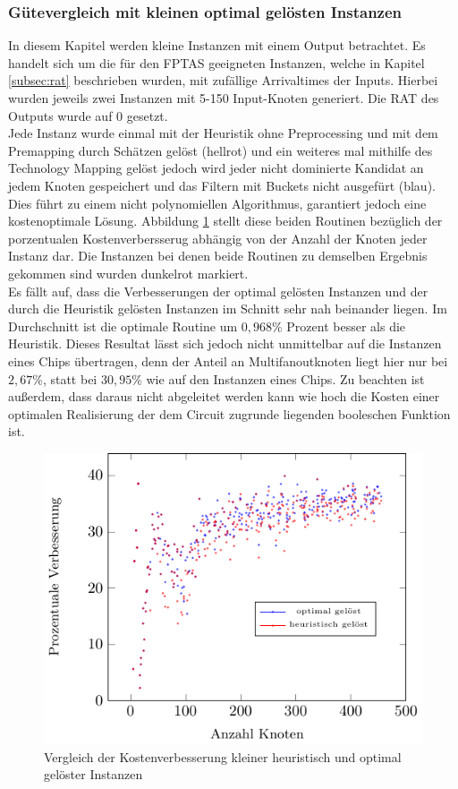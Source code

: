 \documentclass[11pt, a4paper, german]{article}
\newcommand{\TM}{Technology  Mapping }
\begin{document}
\subsubsection{Gütevergleich mit kleinen optimal gel\"osten Instanzen}
\label{subsubsec:guetevgl_kleiner_opt_instanzen}
In diesem Kapitel werden kleine Instanzen mit einem Output betrachtet. Es handelt sich um die f\"ur den FPTAS geeigneten Instanzen, welche in Kapitel \ref{subsec:rat} beschrieben wurden, mit zuf\"allige Arrivaltimes der Inputs. Hierbei wurden jeweils zwei Instanzen mit 5-150 Input-Knoten generiert. Die RAT des Outputs wurde auf $0$ gesetzt.\\
Jede Instanz wurde einmal mit der Heuristik ohne Preprocessing und mit dem Premapping durch Sch\"atzen gel\"ost (hellrot) und ein weiteres mal mithilfe des \TM gel\"ost jedoch wird jeder nicht dominierte Kandidat an jedem Knoten gespeichert und das Filtern mit Buckets nicht ausgef\"urt (blau). Dies f\"uhrt zu einem nicht polynomiellen Algorithmus, garantiert jedoch eine kostenoptimale L\"osung. Abbildung \ref{bild:small_opt_test} stellt diese beiden Routinen bez\"uglich der porzentualen Kostenverbersserug abh\"angig von der Anzahl der Knoten jeder Instanz dar.
Die Instanzen bei denen beide Routinen zu demselben Ergebnis gekommen sind wurden dunkelrot markiert.\\
Es f\"allt auf, dass die Verbesserungen der optimal gel\"osten Instanzen und der durch die Heuristik gel\"osten Instanzen im Schnitt sehr nah beinander liegen. Im Durchschnitt ist die optimale Routine um $0,968\%$ Prozent besser als die Heuristik. Dieses Resultat l\"asst sich jedoch nicht unmittelbar auf die Instanzen eines Chips \"ubertragen, denn der Anteil an Multifanoutknoten liegt hier nur bei $2,67\%$, statt bei $30,95\%$ wie auf den Instanzen eines Chips. Zu beachten ist au{\ss}erdem, dass daraus nicht abgeleitet werden kann wie hoch die Kosten einer optimalen  Realisierung der dem Circuit zugrunde liegenden booleschen Funktion ist.\\
\begin{figure}[h]
		\centering
		\includegraphics[width = 12.5cm]{pictures/tex_files/analysis/small_opt_test}
		\caption{Vergleich der Kostenverbesserung kleiner heuristisch und optimal gel\"oster Instanzen }
		\label{bild:small_opt_test}
\end{figure}
\end{document}
